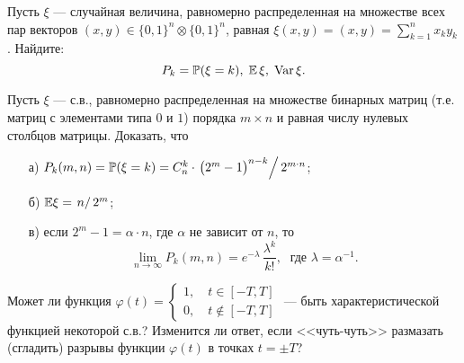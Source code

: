 \begin{problem}
Пусть $\xi$ --- случайная величина, равномерно распределенная на множестве всех пар векторов 
$(x,y)\in \{ 0,1\}^n\otimes \{ 0,1\}^n$, равная $\xi(x,y)=(x,y)=\sum\limits_{k=1}^{n} x_k y_k$. Найдите: 
$$
P_k={\mathbb P}(\xi=k), \; {\mathbb E}\,\xi, \; \mathop{\mathrm{Var}}\nolimits \xi . 
$$
\end{problem}



\begin{problem}
Пусть $\xi$ --- с.в., равномерно распределенная на множестве бинарных матриц (т.е. матриц с элементами типа $0$ и $1$) порядка 
$m\times n$ и равная числу нулевых столбцов матрицы. Доказать, что 
\begin{enumerate}
\item[а)] $P_k(m,n)={\mathbb P}(\xi=k)=C_n^k\cdot \left.\bigl( 2^m -1\bigr)^{n-k}\right/ 2^{m\cdot n}$; 

\item[б)] ${\mathbb E}\xi=\left. n\right/2^m$; 
\item[в)] если $2^m-1=\alpha\cdot n$, где $\alpha$ не зависит от $n$, то 
$$
\lim\limits_{n\to\infty} P_k(m,n)=e^{-\lambda}\, \frac{\lambda^k}{k!} ,\; \text{ где } \lambda=\alpha^{-1} .
$$
\end{enumerate}
\end{problem}

\begin{comment}
\begin{ordre}

Рассмотрим следующие случайные величины: 
$$
\xi_i=\begin{cases}
1, & \text{ $i$-й столбец нулевой}, \\
0, & \text{ иначе }.
\end{cases} 
$$
Тогда $\xi_i\in\Be$, $\xi=\xi_1+\ldots +\xi_n$. 

Имеет место следующее мультипликативное свойство:
$$
\psi_{\xi}(z)=\bigl[\psi_{\xi_i}(z)\bigr]^n
$$

\end{ordre}
\end{comment}

\begin{problem}
Может ли функция $\varphi(t)=\begin{cases}1,\quad t\in[-T,T]\\
0,\quad t\notin[-T,T] \end{cases}$ --- 
быть характеристической функцией некоторой с.в.? Изменится ли ответ, если <<чуть-чуть>> размазать (сгладить) разрывы функции 
$\varphi(t)$ в точках $t=\pm T$? 
\end{problem}

